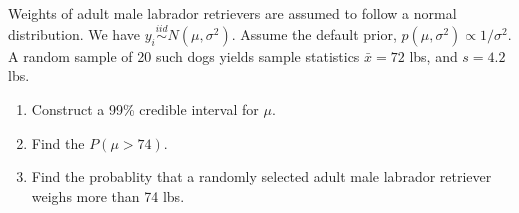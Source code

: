   \item 
 Weights of adult male labrador retrievers are assumed to follow a normal distribution. We have $y_i\stackrel{iid}{\sim}N(\mu, \sigma^2)$. Assume the default prior, $p(\mu, \sigma^2)\propto 1/\sigma^2$. A random sample of 20 such dogs yields sample statistics $\bar{x}=72$ lbs, and $s=4.2$ lbs. 
 
     
    \begin{enumerate}
      \item Construct a 99\% credible interval for $\mu$. 
      \item Find the $P(\mu>74)$. 
      \item Find the probablity that a randomly selected adult male labrador retriever weighs more than 74 lbs. 
\end{enumerate}

